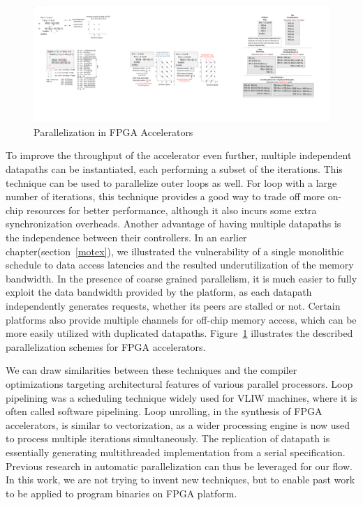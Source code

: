 \begin{figure}[htp]
\begin{center}
\includegraphics[width=0.7\linewidth]{chap6fig/fpgaParallel.pdf}
\caption{Parallelization in FPGA Accelerators
\label{fig:fpgaparal}}
\end{center}
\end{figure}

To improve the throughput of the accelerator even further, multiple
independent datapaths can be instantiated, each performing a subset of 
the iterations. This technique can be used to parallelize outer loops
as well. For loop with a large number of iterations, this technique provides a good way to trade off more on-chip resources for better performance, although
it also incurs some extra synchronization overheads. Another advantage of
having multiple datapaths is the independence between their controllers.
In an earlier chapter(section~\ref{motex}), we illustrated the vulnerability
of a single monolithic schedule to data access latencies and the resulted
underutilization of the memory bandwidth. In the presence of coarse grained parallelism, it is much easier to fully exploit the data bandwidth provided
by the platform, as each datapath independently generates requests, whether
its peers are stalled or not. 
Certain platforms also provide multiple channels
for off-chip memory access, which can be more easily utilized with duplicated datapaths.
Figure~\ref{fig:fpgaparal} illustrates the described parallelization schemes for FPGA accelerators.

We can draw similarities between these techniques and the compiler optimizations targeting architectural features
of various parallel processors. Loop pipelining was a scheduling technique
widely used for VLIW machines, where it is often called software pipelining. Loop unrolling, in the synthesis of FPGA
accelerators, is similar to vectorization, as a wider processing engine
is now used to process multiple iterations simultaneously. The replication of
datapath is essentially generating multithreaded implementation from a serial
specification. Previous research in automatic parallelization can thus be
leveraged for our flow. In this work, we are not trying to invent new techniques, but to enable past work to be applied to program binaries on FPGA
platform. 

